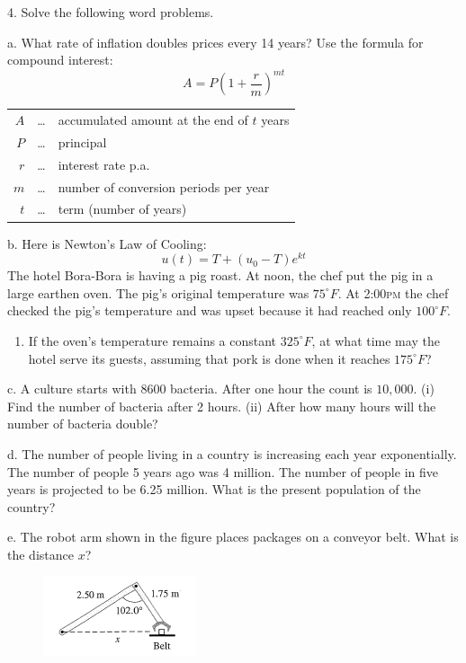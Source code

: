 \documentclass[11pt]{article}
\begin{document}
4. Solve the following word problems.

a. What rate of inflation doubles prices every 14 years? Use the
formula for compound interest:
\begin{equation}
  \label{eq:quahphia}
    A=P\left(1+\frac{r}{m}\right)^{mt}
\end{equation}
\begin{tabular}{rcl}
  $A$&\ldots&accumulated amount at the end of $t$ years \\
  $P$&\ldots&principal \\
  $r$&\ldots&interest rate p.a. \\
  $m$&\ldots&number of conversion periods per year \\
  $t$&\ldots&term (number of years)
\end{tabular}

b. Here is Newton's Law of Cooling:
\begin{equation}
  \label{eq:iemahbec}
  u(t)=T+(u_{0}-T)e^{kt}
\end{equation}
The hotel Bora-Bora is having a pig roast. At noon, the chef put the
pig in a large earthen oven. The pig's original temperature was
$75^{\circ}F$. At 2:00\textsc{pm} the chef checked the pig's
temperature and was upset because it had reached only $100^{\circ}F$.
\begin{enumerate}
\item If the oven's temperature remains a constant $325^{\circ}F$, at
  what time may the hotel serve its guests, assuming that pork is done
  when it reaches $175^{\circ}F$?
\end{enumerate}

c. A culture starts with 8600 bacteria. After one hour the count is
$10,000$. (i) Find the number of bacteria after 2 hours. (ii) After
how many hours will the number of bacteria double?

d. The number of people living in a country is increasing each year
exponentially. The number of people 5 years ago was 4 million. The
number of people in five years is projected to be 6.25 million. What
is the present population of the country?

e. The robot arm shown in the figure places packages on a conveyor
belt. What is the distance $x$?

\begin{figure}[h]
   \includegraphics[scale=.5]{./tri-01.png}
\end{figure}
\end{document}
